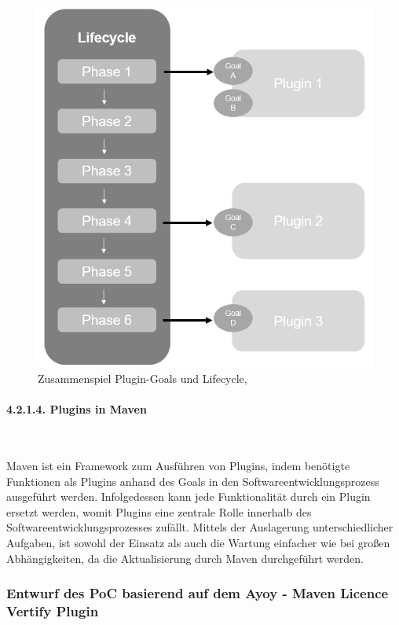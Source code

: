 \begin{figure}[h]
    \centering
    \includegraphics[scale=0.4]{Bilder/lifecycle_maven.png}
    \caption{Zusammenspiel Plugin-Goals und Lifecycle, \cite[S. 59]{varanasi_introducing_2019}}
\end{figure}

\paragraph{4.2.1.4. Plugins in Maven} $~$

Maven ist ein Framework zum Ausführen von Plugins, indem benötigte Funktionen als Plugins anhand des Goals in den Softwareentwicklungsprozess ausgeführt werden. Infolgedessen kann jede Funktionalität durch ein Plugin ersetzt werden, womit Plugins eine zentrale Rolle innerhalb des Softwareentwicklungsprozesses zufällt. Mittels der Auslagerung unterschiedlicher Aufgaben, ist sowohl der Einsatz als auch die Wartung einfacher wie bei großen Abhängigkeiten, da die Aktualisierung durch Maven durchgeführt werden.  

\subsubsection{Entwurf des PoC basierend auf dem Ayoy - Maven Licence Vertify Plugin}

